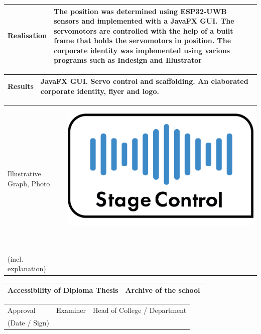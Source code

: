 \begin{tabular}{|p{\feldC}|p{\feldD}|}
 \hline
 Realisation & The position was determined using ESP32-UWB sensors and implemented with a JavaFX GUI. The servomotors are controlled with the help of a built frame that holds the servomotors in position. The corporate identity was implemented using various programs such as Indesign and Illustrator \\
 \hline
\end{tabular}

\begin{tabular}{|p{\feldC}|p{\feldD}|}
 \hline
 Results & JavaFX GUI. Servo control and scaffolding. An elaborated corporate identity, flyer and logo. \\
 \hline
\end{tabular}

\begin{tabular}{|p{\feldC}|p{\feldD}|}
 \hline
 Illustrative Graph, Photo & \begin{minipage}{0.6\textwidth}
 	\includegraphics[width=0.8\linewidth]{images/Logo StageControl.png}
 	\label{fig:Logo StageControl_short}
 \end{minipage} \ \\
 (incl. explanation) & \\
 \hline
\end{tabular}

\begin{tabular}{|p{\feldC}|p{\feldD}|}
 \hline
 Accessibility of Diploma Thesis & Archive of the school \\
 \hline
\end{tabular}

\begin{tabular}{|p{\feldC}|p{\feldE}|p{\feldE}|}
 \hline
 Approval & \scriptsize{Examiner} & \scriptsize{Head of College / Department}\\ 
 (Date / Sign)& & \\
 \hline
\end{tabular}
\linespread{1.25} \normalsize
